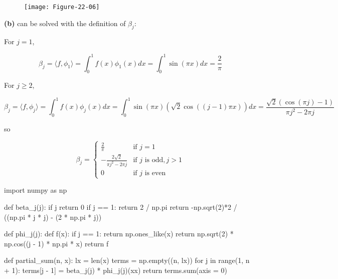 \begin{figure}[H]
\texttt{[image: Figure-22-06]}
\end{figure}

\textbf{(b)} can be solved with the definition of \(\beta_j\):

For \(j = 1\),

\[ \beta_j = \langle f, \phi_1 \rangle = \int_0^1 f(x) \phi_1(x) dx = \int_0^1 \sin(\pi x) dx = \frac{2}{\pi} \]

For \(j \geq 2\),

\[
\beta_j = \langle f, \phi_j \rangle = \int_0^1 f(x) \phi_j(x) dx = \int_0^1 \sin(\pi x) \left( \sqrt{2} \cos((j-1) \pi x) \right) dx = \frac{\sqrt{2} (\cos(\pi j) - 1)}{\pi j^2 - 2 \pi j }
\]

so

\[ \beta_j = \begin{cases}
\frac{2}{\pi} & \text{if } j = 1\\
-\frac{2\sqrt{2}}{\pi j^2 - 2 \pi j} & \text{if } j \text{ is odd}, j > 1 \\
0 & \text{if } j \text{ is even}
\end{cases} \]

\begin{python}
import numpy as np

def beta_j(j):
    if j %
        return 0
    if j == 1:
        return 2 / np.pi
    return -np.sqrt(2)*2 / ((np.pi * j * j) - (2 * np.pi * j))

def phi_j(j):
    def f(x):
        if j == 1:
            return np.ones_like(x)
        return np.sqrt(2) * np.cos((j - 1) * np.pi * x)
    return f

def partial_sum(n, x):
    lx = len(x)
    terms = np.empty((n, lx))
    for j in range(1, n + 1):
        terms[j - 1] = beta_j(j) * phi_j(j)(xx)
    return terms.sum(axis = 0)
\end{python}


